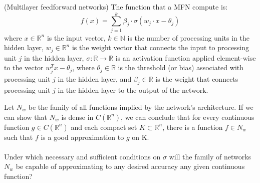 \documentclass[../main.tex]{subfiles}
\begin{document}
\begin{definition} (Multilayer feedforward networks) The function that a MFN compute is: 
	$$f(x)=\sum_{j=1}^k \beta_j \cdot \sigma(w_j \cdot x - \theta_j)$$
	where $x \in \mathbb{R}^n$ is the input vector, $k \in \mathbb{N}$ is the number of processing units in the hidden layer, $w_j \in \mathbb{R}^n$ is the weight vector that connects the input to processing unit $j$ in the hidden layer, $\sigma : \mathbb{R} \rightarrow \mathbb{R}$ is an activation function applied element-wise to the vector $w_j^T x - \theta_j$, where $\theta_j \in \mathbb{R}$ is the threshold (or bias) associated with processing unit $j$ in the hidden layer, and $\beta_j \in \mathbb{R}$ is the weight that connects processing unit $j$ in the hidden layer to the output of the network.

\end{definition}
\noindent Let $N_{w}$ be the family of all functions implied by the network's architecture.  If we can show that $N_{w}$ is dense in $C(\mathbb{R}^n)$, we can conclude that for every continuous function $g \in C(\mathbb{R}^n) $ and each compact set $K \subset \mathbb{R}^n$, there is a function $f \in N_{w}$ such that $f$ is a good approximation to $g$ on K. \\ \\
\noindent Under which necessary and sufficient conditions on $\sigma$ will the family of networks $N_w$ be capable of approximating to any desired accuracy any given continuous function?
\end{document}
